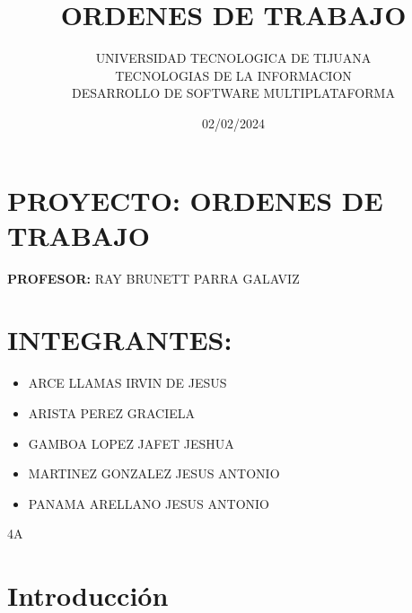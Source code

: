 \documentclass[12pt,a4paper, twosite]{article}
\date{02/02/2024}
\begin{document}
    \vspace{150pt}
\title{ORDENES DE TRABAJO}
\author{UNIVERSIDAD TECNOLOGICA DE TIJUANA \\ TECNOLOGIAS DE LA INFORMACION \\ DESARROLLO DE SOFTWARE MULTIPLATAFORMA}
\vspace{200pt}
\maketitle
\begin{center}
\vspace{50pt}
\section*{PROYECTO: ORDENES DE TRABAJO}
\textbf{PROFESOR:} RAY BRUNETT PARRA GALAVIZ

\vspace{110pt}

\section*{INTEGRANTES:}
\begin{itemize}
\centering
\vspace{20pt}
    \item ARCE LLAMAS IRVIN DE JESUS
    \item ARISTA PEREZ GRACIELA
    \item GAMBOA LOPEZ JAFET JESHUA
    \item MARTINEZ GONZALEZ JESUS ANTONIO
    \item PANAMA ARELLANO JESUS ANTONIO
\end{itemize}

4A
\thispagestyle{empty}
\end{center}

\vspace{200pt}

\maketitle
\tableofcontents
\thispagestyle{empty}
\newpage
\section{Introducción}
\label{sec:org60390fa}
\end{document}
